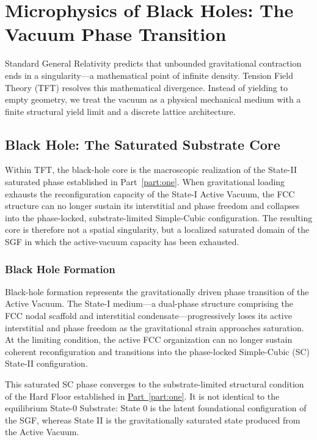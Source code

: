\chapter{Microphysics of Black Holes: The Vacuum Phase Transition}
\label{chap:black_holes}

Standard General Relativity predicts that unbounded gravitational contraction ends in a singularity---a mathematical point of infinite density. Tension Field Theory (TFT) resolves this mathematical divergence. Instead of yielding to empty geometry, we treat the vacuum as a physical mechanical medium with a finite structural yield limit and a discrete lattice architecture.

\section{Black Hole: The Saturated Substrate Core}

Within TFT, the black-hole core is the macroscopic realization of the State-II saturated phase established in Part~\ref{part:one}. When gravitational loading exhausts the reconfiguration capacity of the State-I Active Vacuum, the FCC structure can no longer sustain its interstitial and phase freedom and collapses into the phase-locked, substrate-limited Simple-Cubic configuration. The resulting core is therefore not a spatial singularity, but a localized saturated domain of the SGF in which the active-vacuum capacity has been exhausted.

\subsection{Black Hole Formation}
\label{sec:black_hole_mechanics}

Black-hole formation represents the gravitationally driven phase transition of the Active Vacuum. The State-I medium---a dual-phase structure comprising the FCC nodal scaffold and interstitial condensate---progressively loses its active interstitial and phase freedom as the gravitational strain approaches saturation. At the limiting condition, the active FCC organization can no longer sustain coherent reconfiguration and transitions into the phase-locked Simple-Cubic (SC) State-II configuration.

This saturated SC phase converges to the substrate-limited structural condition of the Hard Floor established in \hyperref[part:one]{Part~\ref{part:one}}. It is not identical to the equilibrium State-0 Substrate: State 0 is the latent foundational configuration of the SGF, whereas State II is the gravitationally saturated state produced from the Active Vacuum.

